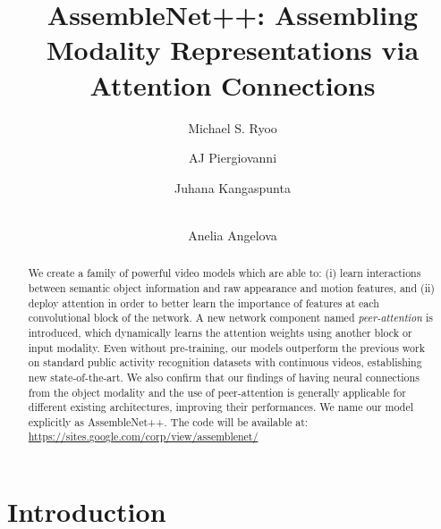 \documentclass[runningheads]{llncs}
\begin{document}
\pagestyle{headings}
\mainmatter
\def\ECCVSubNumber{3586}  

\title{AssembleNet++: Assembling Modality Representations via Attention Connections}


\begin{comment}
\titlerunning{ECCV-20 submission ID \ECCVSubNumber} 
\authorrunning{ECCV-20 submission ID \ECCVSubNumber} 
\author{Anonymous ECCV submission}
\institute{Paper ID \ECCVSubNumber}


\end{comment}




\author{Michael S. Ryoo \and
AJ Piergiovanni \and
Juhana Kangaspunta \and \\Anelia Angelova}
\maketitle



\begin{abstract}
We create a family of powerful video models which are able to: (i) learn interactions between semantic object information and raw appearance and motion features, and (ii) deploy attention in order to better learn the importance of features at each convolutional block of the network. A new network component named \emph{peer-attention} is introduced, which dynamically learns the attention weights using another block or input modality. Even without pre-training, our models outperform the previous work on standard public activity recognition datasets with continuous videos, establishing new state-of-the-art. We also confirm that our findings of having neural connections from the object modality and the use of peer-attention is generally applicable for different existing architectures, improving their performances. We name our model explicitly as AssembleNet++. The code will be available at: \url{https://sites.google.com/corp/view/assemblenet/}

\end{abstract}




\section{Introduction}
\end{document}
